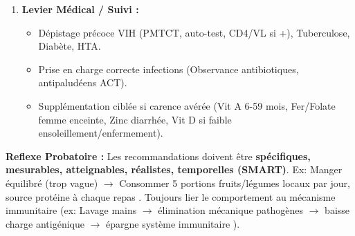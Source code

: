\documentclass[11pt]{article}
\begin{document}
\begin{methode}
\begin{enumerate}
\begin{itemize}
            \item \textbf{Évitement toxiques :} \textbf{Zéro tabac} (actif/passif), \textbf{Alcool modéré/abstinence} (pas d'alcool < 18 ans, femme enceinte), \textbf{Non aux drogues} (Tramadol, cannabis, cocaïne $\rightarrow$ immunodépression sévère).
        \end{itemize}
        \item \textbf{Levier Médical / Suivi :}
        \begin{itemize}
            \item Dépistage précoce VIH (PMTCT, auto-test, CD4/VL si +), Tuberculose, Diabète, HTA.
            \item Prise en charge correcte infections (Observance antibiotiques, antipaludéens ACT).
            \item Supplémentation ciblée si carence avérée (Vit A 6-59 mois, Fer/Folate femme enceinte, Zinc diarrhée, Vit D si faible ensoleillement/enfermement).
        \end{itemize}
    \end{enumerate}
    \textbf{Reflexe Probatoire :} Les recommandations doivent être \textbf{spécifiques, mesurables, atteignables, réalistes, temporelles (SMART)}. Ex: \og Manger équilibré \fg (trop vague) $\rightarrow$ \og Consommer 5 portions fruits/légumes locaux par jour, source protéine à chaque repas \fg. Toujours lier le comportement au mécanisme immunitaire (ex: \og Lavage mains $\rightarrow$ élimination mécanique pathogènes $\rightarrow$ baisse charge antigénique $\rightarrow$ épargne système immunitaire \fg).
\end{methode}
\end{document}
